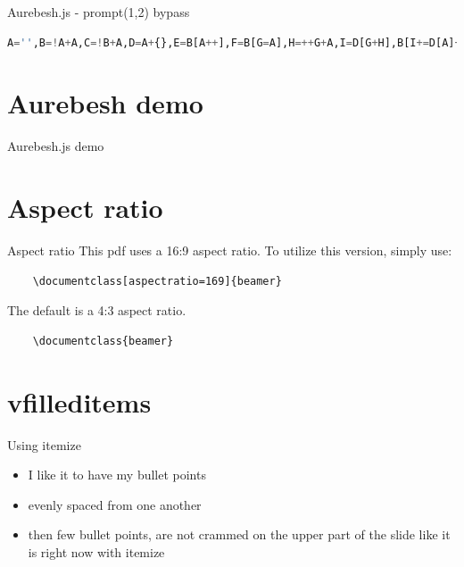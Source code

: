 \documentclass[aspectratio=169]{beamer}
\newcommand{\supertext}[1]{\fontsize{30}{40}\selectfont #1}
\begin{document}
\begin{frame}[fragile]{Aurebesh.js - prompt(1,2) bypass}
	\begin{lstlisting}[style=basicStyle, language=Python]
A='',B=!A+A,C=!B+A,D=A+{},E=B[A++],F=B[G=A],H=++G+A,I=D[G+H],B[I+=D[A]+(B.C+D)[A]+C[H]+E+F+B[G]+I+E+D[A]+F][I]('p'+F+D[A]+'m'+'p'+E+'(A,++A)')()
\end{lstlisting}
\end{frame}

\section*{Aurebesh demo}
\begin{frame}
	\centering
	\vfill
	\supertext{Aurebesh.js demo}
	\vfill
\end{frame}

\section{Aspect ratio}
\begin{frame}[fragile]{Aspect ratio}
	This pdf uses a 16:9 aspect ratio. To utilize
	this version, simply use:
	\begin{verbatim}
    \documentclass[aspectratio=169]{beamer}
    \end{verbatim}
	\vfill
	The default is a 4:3 aspect ratio.
	\begin{verbatim}
    \documentclass{beamer}
  \end{verbatim}
\end{frame}

\section{vfilleditems}
\begin{frame}{Using itemize}
	\begin{itemize}
		\item I like it to have my bullet points
		\item evenly spaced from one another
		\item then few bullet points, are not crammed on
		      the upper part of the slide
		      like it is right now with itemize
	\end{itemize}
\end{frame}
\end{document}
